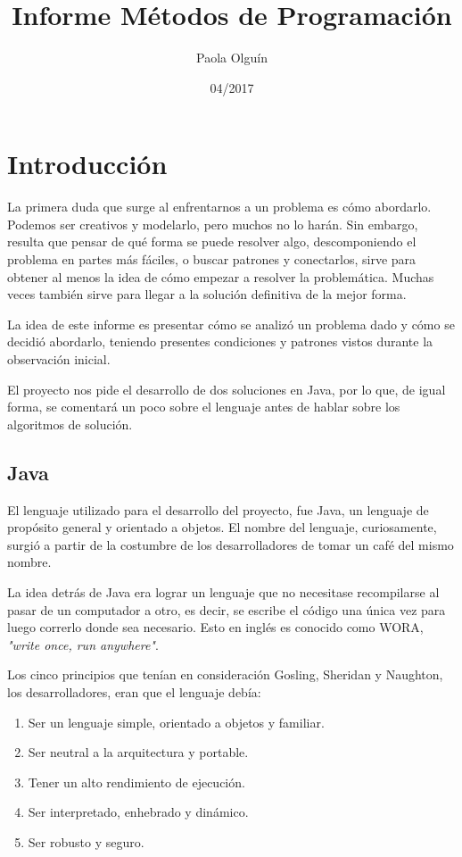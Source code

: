\documentclass[letterpaper]{article}
\title{Informe M\'etodos de Programaci\'on}
\date{04/2017}
\author{Paola Olgu\'in}
\begin{document}

  \maketitle{}

  \newpage


  \tableofcontents{}
  \newpage
  \section{Introducci\'on}
  La primera duda que surge al enfrentarnos a un problema es c\'omo abordarlo.
  Podemos ser creativos y modelarlo, pero muchos no lo har\'an. Sin embargo,
  resulta que pensar de qu\'e forma se puede resolver algo, descomponiendo el
  problema en partes m\'as f\'aciles, o buscar patrones y conectarlos, sirve para
  obtener al menos la idea de c\'omo empezar a resolver la problem\'atica. Muchas
  veces tambi\'en sirve para llegar a la soluci\'on definitiva de la mejor forma.

  La idea de este informe es presentar c\'omo se analiz\'o un problema dado y
  c\'omo se decidi\'o abordarlo, teniendo presentes condiciones y patrones vistos
  durante la observaci\'on inicial.

  El proyecto nos pide el desarrollo de dos soluciones en Java, por lo que,
  de igual forma, se comentar\'a un poco sobre el lenguaje antes de hablar sobre
  los algoritmos de soluci\'on.

  \subsection{Java}
  El lenguaje utilizado para el desarrollo del proyecto, fue Java, un lenguaje de
  prop\'osito general y orientado a objetos. El nombre del lenguaje, curiosamente,
  surgi\'o a partir de la costumbre de los desarrolladores de tomar un caf\'e del mismo nombre.

  La idea detr\'as de Java era lograr un lenguaje que no necesitase recompilarse al pasar de un computador
  a otro, es decir, se escribe el c\'odigo una \'unica vez para luego correrlo donde
  sea necesario. Esto en ingl\'es es conocido como WORA, \textit{"write once, run anywhere"}.

  Los cinco principios que ten\'ian en consideraci\'on Gosling, Sheridan y Naughton, los desarrolladores,
  eran que el lenguaje deb\'ia:
  \begin{enumerate}
    \item Ser un lenguaje simple, orientado a objetos y familiar.
    \item Ser neutral a la arquitectura y portable.
    \item Tener un alto rendimiento de ejecuci\'on.
    \item Ser interpretado, enhebrado y din\'amico.
    \item Ser robusto y seguro.
  \end{enumerate}
  \newpage
\end{document}
